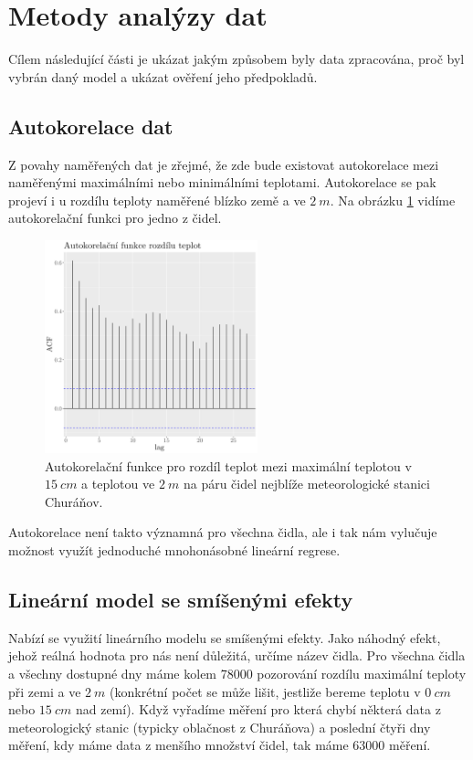 \section{Metody analýzy dat}
Cílem následující části je ukázat jakým způsobem byly data zpracována, proč byl vybrán daný model a ukázat ověření jeho předpokladů.

\subsection{Autokorelace dat}
Z povahy naměřených dat je zřejmé, že zde bude existovat autokorelace mezi naměřenými maximálními nebo minimálními teplotami. Autokorelace se pak projeví i u rozdílu teploty naměřené blízko země a ve $\SI{2}{m}$. Na obrázku \ref{fig:acf} vidíme autokorelační funkci pro jedno z čidel.

\begin{figure}
	\centering
	\includegraphics[width=0.55\textwidth]{img/ch2/acfNPS_4311_D_TMS.png}
	\caption{Autokorelační funkce pro rozdíl teplot mezi maximální teplotou v $\SI{15}{cm}$ a teplotou ve $\SI{2}{m}$ na páru čidel nejblíže meteorologické stanici Churáňov.}
	\label{fig:acf}
\end{figure}

Autokorelace není takto významná pro všechna čidla, ale i tak nám vylučuje možnost využít jednoduché mnohonásobné lineární regrese.

\subsection{Lineární model se smíšenými efekty}
Nabízí se využití lineárního modelu se smíšenými efekty. Jako náhodný efekt, jehož reálná hodnota pro nás není důležitá, určíme název čidla. Pro všechna čidla a všechny dostupné dny máme kolem 78000 pozorování rozdílu maximální teploty při zemi a ve $\SI{2}{m}$ (konkrétní počet se může lišit, jestliže bereme teplotu v $\SI{0}{cm}$ nebo $\SI{15}{cm}$ nad zemí). Když vyřadíme měření pro která chybí některá data z meteorologický stanic (typicky oblačnost z Churáňova) a poslední čtyři dny měření, kdy máme data z menšího množství čidel, tak máme 63000 měření.

